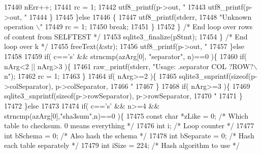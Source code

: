 \begin{DoxyCode}
{{{{{{{{{{{{{{{{{{{{{{{{{{{{{{{{{{{{{{{{{{{{{{{{{{{{{{{{{{{{{{{{{{{{{{{{{{{{{{{{{{{{{{{{{{{{{{{{{{{{{{{{{17440             nErr++;
17441             rc = 1;
17442             utf8_printf(p->out, \textcolor{stringliteral}{"%
17443             utf8_printf(p->out, \textcolor{stringliteral}{"%
17444           \}
17445         \}\textcolor{keywordflow}{else}
17446         \{
17447           utf8_printf(stderr,
17448             \textcolor{stringliteral}{"Unknown operation \(\backslash\)"%
17449           rc = 1;
17450           \textcolor{keywordflow}{break};
17451         \}
17452       \} \textcolor{comment}{/* End loop over rows of content from SELFTEST */}
17453       sqlite3_finalize(pStmt);
17454     \} \textcolor{comment}{/* End loop over k */}
17455     freeText(&str);
17456     utf8_printf(p->out, \textcolor{stringliteral}{"%
17457   \}\textcolor{keywordflow}{else}
17458 
17459   \textcolor{keywordflow}{if}( c==\textcolor{charliteral}{'s'} && strncmp(azArg[0], \textcolor{stringliteral}{"separator"}, n)==0 )\{
17460     \textcolor{keywordflow}{if}( nArg<2 || nArg>3 )\{
17461       raw_printf(stderr, \textcolor{stringliteral}{"Usage: .separator COL ?ROW?\(\backslash\)n"});
17462       rc = 1;
17463     \}
17464     \textcolor{keywordflow}{if}( nArg>=2 )\{
17465       sqlite3_snprintf(\textcolor{keyword}{sizeof}(p->colSeparator), p->colSeparator,
17466                        \textcolor{stringliteral}{"%
17467     \}
17468     \textcolor{keywordflow}{if}( nArg>=3 )\{
17469       sqlite3_snprintf(\textcolor{keyword}{sizeof}(p->rowSeparator), p->rowSeparator,
17470                        \textcolor{stringliteral}{"%
17471     \}
17472   \}\textcolor{keywordflow}{else}
17473 
17474   \textcolor{keywordflow}{if}( c==\textcolor{charliteral}{'s'} && n>=4 && strncmp(azArg[0],\textcolor{stringliteral}{"sha3sum"},n)==0 )\{
17475     \textcolor{keyword}{const} \textcolor{keywordtype}{char} *zLike = 0;   \textcolor{comment}{/* Which table to checksum. 0 means everything */}
17476     \textcolor{keywordtype}{int} i;                   \textcolor{comment}{/* Loop counter */}
17477     \textcolor{keywordtype}{int} bSchema = 0;         \textcolor{comment}{/* Also hash the schema */}
17478     \textcolor{keywordtype}{int} bSeparate = 0;       \textcolor{comment}{/* Hash each table separately */}
17479     \textcolor{keywordtype}{int} iSize = 224;         \textcolor{comment}{/* Hash algorithm to use */}
}}}}}}}}}}}}}}}}}}}}}}}}}}}}}}}}}}}}}}}}}}}}}}}}}}}}}}}}}}}}}}}}}}}}}}}}}}}}}}}}}}}}}}}}}}}}}}}}}}}}}}}}}}}}}}}
\end{DoxyCode}
